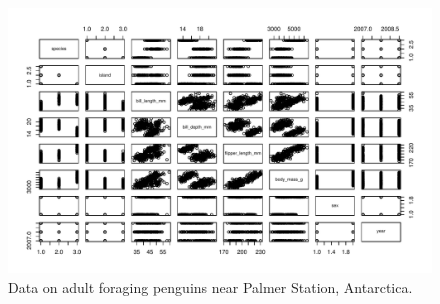 \documentclass{article}\usepackage[]{graphicx}\usepackage[]{xcolor}
\begin{document}
\begin{figure}[H]
  \begin{center}
  \includegraphics[scale=0.8]{figure/penguins.pdf}
  \caption{Data on adult foraging penguins near Palmer Station, Antarctica.}
  \label{plot2}
  \end{center}
\end{figure}
\end{document}
